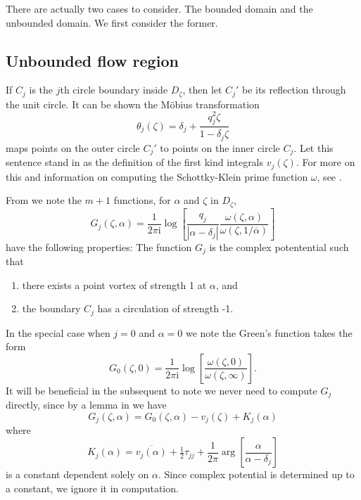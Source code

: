 \documentclass[12pt,fleqn]{article}
\newcommand{\conj}[1]{\overline{#1}}
\newcommand{\uconj}[1]{1/\conj{#1}}
\renewcommand{\i}{\mathrm{i}}
\begin{document}
There are actually two cases to consider. The bounded domain and the unbounded domain. We first consider the former.

\subsection{Unbounded flow region}
If $C_j$ is the $j$th circle boundary inside $D_\zeta$, then let $C_j'$ be its reflection through the unit circle. It can be shown the M\"obius transformation
\begin{equation*}
  \theta_j(\zeta) = \delta_j + \frac{q_j^2 \zeta}{1 - \conj{\delta_j}\zeta}
\end{equation*}
maps points on the outer circle $C_j'$ to points on the inner circle $C_j$.
Let this sentence stand in as the definition of the first kind integrals $v_j(\zeta)$.
For more on this and information on computing the Schottky-Klein prime function $\omega$, see \cite{primecalc}.

From \cite{greensfunctions} we note the $m+1$ functions, for $\alpha$ and $\zeta$ in $D_\zeta$,
\begin{equation}
  G_j(\zeta,\alpha) = \frac{1}{2\pi\i} \log \left[ \frac{q_j}{|\alpha - \delta_j|} \frac{\omega(\zeta,\alpha)}{\omega(\zeta,\uconj{\alpha})} \right]
  \label{eq:greensfunction}
\end{equation}
have the following properties: The function $G_j$ is the complex potentential such that
\begin{enumerate}
  \item there exists a point vortex of strength 1 at $\alpha$, and
  \item the boundary $C_j$ has a circulation of strength -1.
\end{enumerate}
In the special case when $j=0$ and $\alpha=0$ we note the Green's function takes the form
\begin{equation*}
  G_0(\zeta,0) = \frac{1}{2\pi\i} \log\left[ \frac{\omega(\zeta,0)}{\omega(\zeta,\infty)} \right].
\end{equation*}
It will be beneficial in the subsequent to note we never need to compute $G_j$ directly, since by a lemma in \cite{primecalc} we have
\begin{equation*}
  G_j(\zeta,\alpha) = G_0(\zeta,\alpha) - v_j(\zeta) + K_j(\alpha)
\end{equation*}
where
\begin{equation*}
  K_j(\alpha) = \conj{v_j(\alpha)} + \tfrac{1}{2}\tau_{jj} + \frac{1}{2\pi}\arg\left[ \frac{\alpha}{\alpha - \delta_j} \right]
\end{equation*}
is a constant dependent solely on $\alpha$. Since complex potential is determined up to a constant, we ignore it in computation.
\end{document}
